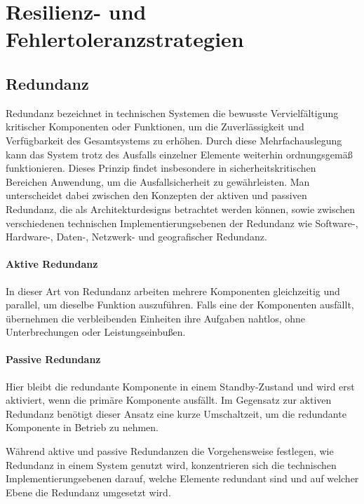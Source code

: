\section{Resilienz- und Fehlertoleranzstrategien}

\subsection{Redundanz}

Redundanz bezeichnet in technischen Systemen die bewusste Vervielfältigung kritischer Komponenten oder Funktionen,
um die Zuverlässigkeit und Verfügbarkeit des Gesamtsystems zu erhöhen.
Durch diese Mehrfachauslegung kann das System trotz des Ausfalls einzelner Elemente weiterhin ordnungsgemäß
funktionieren.
Dieses Prinzip findet insbesondere in sicherheitskritischen Bereichen Anwendung, um die Ausfallsicherheit
zu gewährleisten. Man unterscheidet dabei zwischen den Konzepten der aktiven und passiven Redundanz, die als Architekturdesigns betrachtet werden können, sowie zwischen verschiedenen technischen Implementierungsebenen der Redundanz wie Software-, Hardware-, Daten-, Netzwerk- und geografischer Redundanz.

\paragraph{Aktive Redundanz}
In dieser Art von Redundanz arbeiten mehrere Komponenten gleichzeitig und parallel, um dieselbe Funktion auszuführen. Falls eine der Komponenten ausfällt, übernehmen die verbleibenden Einheiten ihre Aufgaben nahtlos, ohne Unterbrechungen oder Leistungseinbußen. 

\paragraph{Passive Redundanz}
Hier bleibt die redundante Komponente in einem Standby-Zustand und wird erst aktiviert, wenn die primäre Komponente ausfällt. Im Gegensatz zur aktiven Redundanz benötigt dieser Ansatz eine kurze Umschaltzeit, um die redundante Komponente in Betrieb zu nehmen.

Während aktive und passive Redundanzen die Vorgehensweise festlegen, wie Redundanz in einem System genutzt wird, konzentrieren sich die technischen Implementierungsebenen darauf, welche Elemente redundant sind und auf welcher Ebene die Redundanz umgesetzt wird. 

